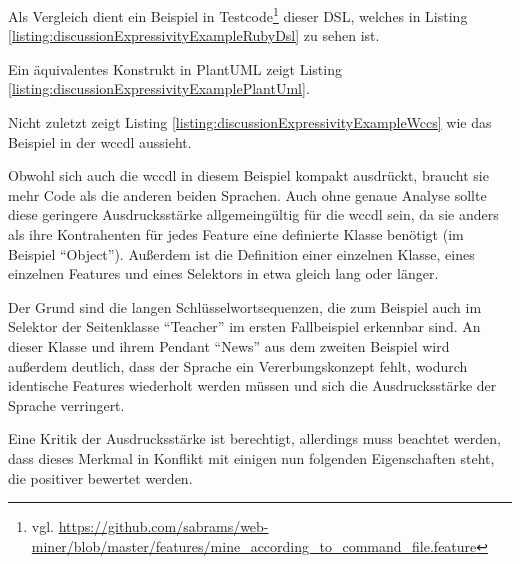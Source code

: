     Als Vergleich dient ein Beispiel in
    Testcode\footnote{vgl. \url{https://github.com/sabrams/web-miner/blob/master/features/mine_according_to_command_file.feature}}
    dieser DSL, welches in Listing \ref{listing:discussionExpressivityExampleRubyDsl}
    zu sehen ist.

    

    Ein äquivalentes Konstrukt in PlantUML zeigt Listing
    \ref{listing:discussionExpressivityExamplePlantUml}.

    

    Nicht zuletzt zeigt Listing \ref{listing:discussionExpressivityExampleWccs}
    wie das Beispiel in der \gls{wccdl} aussieht.

    

    Obwohl sich auch die \gls{wccdl} in diesem Beispiel kompakt ausdrückt,
    braucht sie mehr Code als die anderen beiden Sprachen.
    Auch ohne genaue Analyse sollte diese geringere Ausdrucksstärke
    allgemeingültig für die \gls{wccdl} sein,
    da sie anders als ihre Kontrahenten für jedes Feature eine definierte Klasse
    benötigt (im Beispiel "`Object"').
    Außerdem ist die Definition einer einzelnen Klasse,
    eines einzelnen Features und eines Selektors in etwa gleich lang oder länger.

    Der Grund sind die langen Schlüsselwortsequenzen,
    die zum Beispiel auch im Selektor der Seitenklasse "`Teacher"'
    im ersten Fallbeispiel erkennbar sind.
    An dieser Klasse und ihrem Pendant "`News"' aus dem zweiten Beispiel
    wird außerdem deutlich, dass der Sprache ein Vererbungskonzept fehlt,
    wodurch identische Features wiederholt werden müssen
    und sich die Ausdrucksstärke der Sprache verringert.

    Eine Kritik der Ausdrucksstärke ist berechtigt,
    allerdings muss beachtet werden,
    dass dieses Merkmal in Konflikt mit einigen nun folgenden
    Eigenschaften steht, die positiver bewertet werden.

